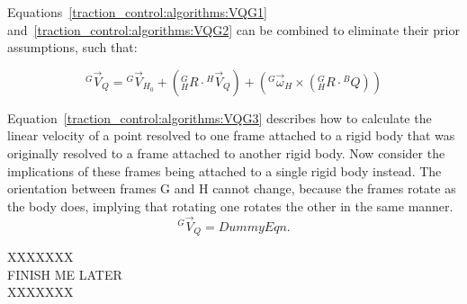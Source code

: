 Equations~\ref{traction_control:algorithms:VQG1} and~\ref{traction_control:algorithms:VQG2} can be combined to eliminate their prior assumptions, such that:

\begin{equation}\label{traction_control:algorithms:VQG3}
	{}^{G}\vec{V}_{Q} = {}^{G}\vec{V}_{H_{0}} + ({}^{G}_{H}R \cdot {}^{H}\vec{V}_{Q}) + ({}^{G}\vec{\omega}_{H} \times ({}^{G}_{H}R \cdot {}^{B}{Q}))
\end{equation}

Equation~\ref{traction_control:algorithms:VQG3} describes how to calculate the linear velocity of a point resolved to one frame attached to a rigid body that was originally resolved to a frame attached to another rigid body. Now consider the implications of these frames being attached to a single rigid body instead. The orientation between frames G and H cannot change, because the frames rotate as the body does, implying that rotating one rotates the other in the same manner. \\

\begin{equation}\label{traction_control:algorithms:VQG4}
	{}^{G}\vec{V}_{Q} = DummyEqn.
\end{equation}

XXXXXXX \\
FINISH ME LATER \\
XXXXXXX
